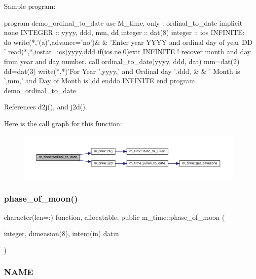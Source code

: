 \begin{DoxyVerb}Sample program:

 program demo_ordinal_to_date
 use M_time, only : ordinal_to_date
 implicit none
 INTEGER            :: yyyy, ddd, mm, dd
 integer            :: dat(8)
 integer            :: ios
   INFINITE: do
      write(*,'(a)',advance='no')&
      & 'Enter year YYYY and ordinal day of year DD '
      read(*,*,iostat=ios)yyyy,ddd
      if(ios.ne.0)exit INFINITE
      ! recover month and day from year and day number.
      call ordinal_to_date(yyyy, ddd, dat)
      mm=dat(2)
      dd=dat(3)
      write(*,*)'For Year ',yyyy,' and Ordinal day ',ddd, &
      &         ' Month is ',mm,' and Day of Month is',dd
    enddo INFINITE
 end program demo_ordinal_to_date \end{DoxyVerb}
 

References d2j(), and j2d().

Here is the call graph for this function\+:\nopagebreak
\begin{figure}[H]
\begin{center}
\leavevmode
\includegraphics[width=350pt]{namespacem__time_aa4dca4409bf20a011bb04988c1335d63_cgraph}
\end{center}
\end{figure}
\mbox{\label{namespacem__time_ab8a976e2f113cc38b6df80974cee55dc}} 
\subsubsection{\texorpdfstring{phase\+\_\+of\+\_\+moon()}{phase\_of\_moon()}}
{\footnotesize\ttfamily character(len=\+:) function, allocatable, public m\+\_\+time\+::phase\+\_\+of\+\_\+moon (\begin{DoxyParamCaption}\item[{integer, dimension(8), intent(in)}]{datin }\end{DoxyParamCaption})}



\subsubsection*{N\+A\+ME}

